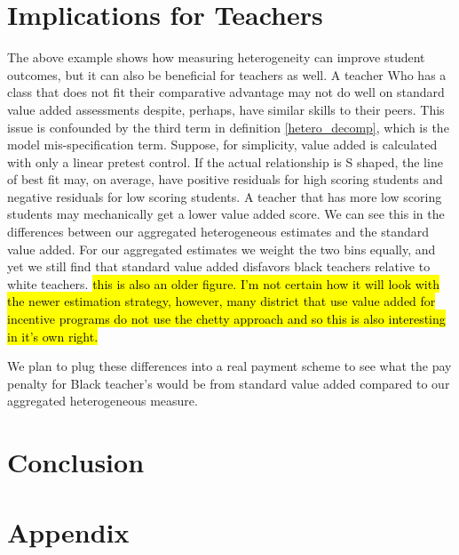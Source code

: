 \documentclass[12pt]{article}
\theoremstyle{definition}
\theoremstyle{definition}
\theoremstyle{definition}
\theoremstyle{definition}
\begin{document}
\section{Implications for Teachers} \label{twell}

The above example shows how measuring heterogeneity can improve student outcomes, but it can also be beneficial for teachers as well. A teacher Who has a class that does not fit their comparative advantage may not do well on standard value added assessments despite, perhaps, have similar skills to their peers. This issue is confounded by the third term in definition \ref{hetero_decomp}, which is the model mis-specification term. Suppose, for simplicity, value added is calculated with only a linear pretest control. If the actual relationship is S shaped, the line of best fit may, on average, have positive residuals for high scoring students and negative residuals for low scoring students. A teacher that has more low scoring students may mechanically get a lower value added score. We can see this in the differences between our aggregated heterogeneous estimates and the standard value added. For our aggregated estimates we weight the two bins equally, and yet we still find that standard value added disfavors black teachers relative to white teachers. \hl{this is also an older figure. I'm not certain how it will look with the newer estimation strategy, however, many district that use value added for incentive programs do not use the chetty approach and so this is also interesting in it's own right.}

    

We plan to plug these differences into a real payment scheme to see what the pay penalty for Black teacher's would be from standard value added compared to our aggregated heterogeneous measure. 

\section{Conclusion} \label{conc} 




\section{Appendix}
\end{document}
